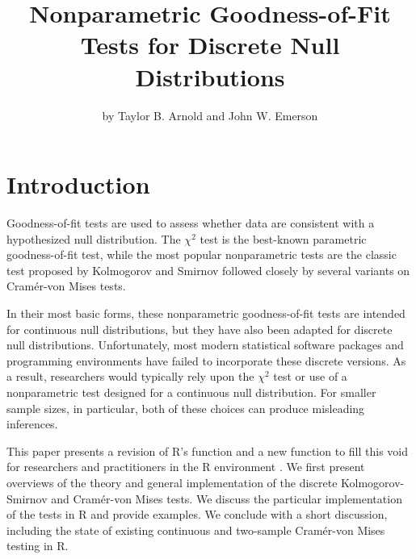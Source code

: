 \title{Nonparametric Goodness-of-Fit Tests for Discrete Null Distributions}
\author{by Taylor B. Arnold and John W. Emerson}

\maketitle




\section{Introduction}

Goodness-of-fit tests are used to assess whether data are consistent
with a hypothesized null distribution.  The $\chi^2$ test is the best-known
parametric goodness-of-fit test, while the most popular nonparametric tests
are the classic test proposed by Kolmogorov and Smirnov followed closely by
several variants on Cram\'{e}r-von Mises tests.

In their most basic forms, these nonparametric goodness-of-fit
tests are intended for continuous null distributions, but they have
also been adapted for discrete null distributions.  Unfortunately,
most modern statistical software packages and programming environments
have failed to incorporate these discrete versions.  As a result,
researchers would typically rely upon the $\chi^2$ test or
use of a nonparametric test designed for a continuous null distribution.
For smaller sample sizes, in particular, both of these choices can produce
misleading inferences.

This paper presents a revision of R's
 function and a new  function to
fill this void for researchers and practitioners in the R environment
\citep{R2010}. 
We first present overviews of the theory and general implementation of the
discrete Kolmogorov-Smirnov and Cram\'{e}r-von Mises tests.  We discuss
the particular implementation of the tests in R and provide examples.  We
conclude with a short discussion, including the state of existing continuous
and two-sample Cram\'{e}r-von Mises testing in R.



